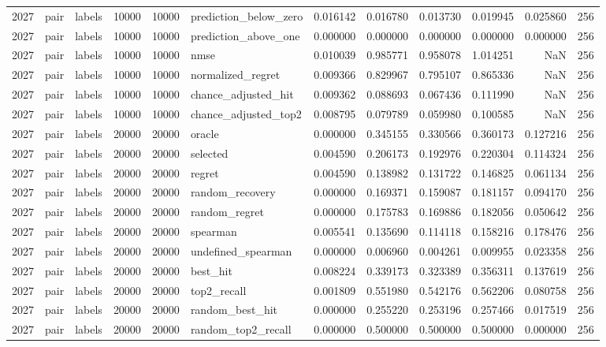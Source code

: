 \begin{tabular}{rllrrlrrrrrr}
2027 & pair & labels & 10000 & 10000 & prediction_below_zero & 0.016142 & 0.016780 & 0.013730 & 0.019945 & 0.025860 & 256 \\
2027 & pair & labels & 10000 & 10000 & prediction_above_one & 0.000000 & 0.000000 & 0.000000 & 0.000000 & 0.000000 & 256 \\
2027 & pair & labels & 10000 & 10000 & nmse & 0.010039 & 0.985771 & 0.958078 & 1.014251 & NaN & 256 \\
2027 & pair & labels & 10000 & 10000 & normalized_regret & 0.009366 & 0.829967 & 0.795107 & 0.865336 & NaN & 256 \\
2027 & pair & labels & 10000 & 10000 & chance_adjusted_hit & 0.009362 & 0.088693 & 0.067436 & 0.111990 & NaN & 256 \\
2027 & pair & labels & 10000 & 10000 & chance_adjusted_top2 & 0.008795 & 0.079789 & 0.059980 & 0.100585 & NaN & 256 \\
2027 & pair & labels & 20000 & 20000 & oracle & 0.000000 & 0.345155 & 0.330566 & 0.360173 & 0.127216 & 256 \\
2027 & pair & labels & 20000 & 20000 & selected & 0.004590 & 0.206173 & 0.192976 & 0.220304 & 0.114324 & 256 \\
2027 & pair & labels & 20000 & 20000 & regret & 0.004590 & 0.138982 & 0.131722 & 0.146825 & 0.061134 & 256 \\
2027 & pair & labels & 20000 & 20000 & random_recovery & 0.000000 & 0.169371 & 0.159087 & 0.181157 & 0.094170 & 256 \\
2027 & pair & labels & 20000 & 20000 & random_regret & 0.000000 & 0.175783 & 0.169886 & 0.182056 & 0.050642 & 256 \\
2027 & pair & labels & 20000 & 20000 & spearman & 0.005541 & 0.135690 & 0.114118 & 0.158216 & 0.178476 & 256 \\
2027 & pair & labels & 20000 & 20000 & undefined_spearman & 0.000000 & 0.006960 & 0.004261 & 0.009955 & 0.023358 & 256 \\
2027 & pair & labels & 20000 & 20000 & best_hit & 0.008224 & 0.339173 & 0.323389 & 0.356311 & 0.137619 & 256 \\
2027 & pair & labels & 20000 & 20000 & top2_recall & 0.001809 & 0.551980 & 0.542176 & 0.562206 & 0.080758 & 256 \\
2027 & pair & labels & 20000 & 20000 & random_best_hit & 0.000000 & 0.255220 & 0.253196 & 0.257466 & 0.017519 & 256 \\
2027 & pair & labels & 20000 & 20000 & random_top2_recall & 0.000000 & 0.500000 & 0.500000 & 0.500000 & 0.000000 & 256 \\

\end{tabular}
